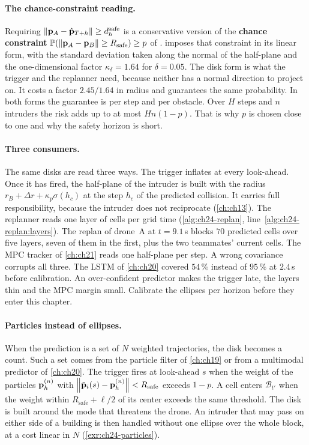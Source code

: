 \paragraph{The chance-constraint reading.}
Requiring $\left\lVert \mathbf{p}_A - \hat{\mathbf{p}}_{T+h} \right\rVert \ge d^{\mathrm{safe}}_h$ is a
conservative version of the \textbf{chance constraint} $\mathbb{P}(\left\lVert \mathbf{p}_A - \mathbf{p}_B \right\rVert \ge R_{\mathrm{safe}}) \ge p$ of
\textcite{zhu2019chance}.  imposes that constraint in its
linear form, with the standard deviation taken along the normal of the
half-plane and the one-dimensional factor $\kappa_\delta = 1.64$ for
$\delta = 0.05$. The disk form is what the trigger and the replanner need,
because neither has a normal direction to project on. It costs a factor
$2.45/1.64$ in radius and guarantees the same probability. In both forms the
guarantee is per step and per obstacle. Over $H$ steps and $n$ intruders the
risk adds up to at most $H n (1 - p)$. That is why $p$ is chosen close to
one and why the safety horizon is short.

\paragraph{Three consumers.}
The same disks are read three ways. The trigger inflates at every
look-ahead. Once it has fired, the \orca half-plane of the intruder is
built with the radius $r_B + \Delta r + \kappa_p\sigma(h_c)$ at the step
$h_c$ of the predicted collision. It carries full responsibility, because the
intruder does not reciprocate (\cref{ch:ch13}). The replanner reads one
layer of cells per grid time (\cref{alg:ch24-replan},
line~\ref{alg:ch24-replan:layers}). The replan of drone~A at $t = 9.1$\,s
blocks $70$ predicted cells over five layers, seven of them in the first,
plus the two teammates' current cells. The MPC
tracker of \cref{ch:ch21} reads one half-plane per step. A wrong covariance
corrupts all three. The LSTM of \cref{ch:ch20} covered $54\,\%$ instead of
$95\,\%$ at $2.4$\,s before calibration. An over-confident predictor
makes the trigger late, the layers thin and the MPC margin small. Calibrate
the ellipses per horizon before they enter this chapter.

\paragraph{Particles instead of ellipses.}
When the prediction is a set of $N$ weighted trajectories, the disk becomes
a count. Such a set comes from the particle filter of \cref{ch:ch19} or from
a multimodal predictor of \cref{ch:ch20}. The trigger fires at look-ahead
$s$ when the weight of the particles $\mathbf{p}^{(n)}_h$ with
$\left\lVert \tilde{\mathbf{p}}_i(s) - \mathbf{p}^{(n)}_h \right\rVert < R_{\mathrm{safe}}$ exceeds
$1 - p$. A cell enters $\mathcal{B}_{t'}$ when the weight within
$R_{\mathrm{safe}} + \ell/2$ of its center exceeds the same threshold. The
\orca disk is built around the mode that threatens the drone. An
intruder that may pass on either side of a building is then handled
without one ellipse over the whole block, at a cost linear in $N$
(\cref{exr:ch24-particles}).

